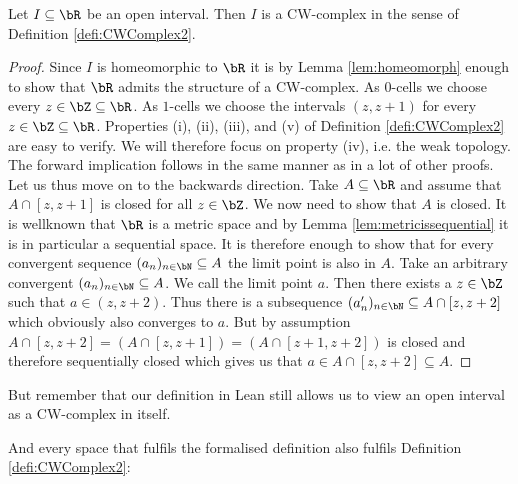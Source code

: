 \begin{example}
  Let $I \subseteq \bR$ be an open interval. 
  Then $I$ is a CW-complex in the sense of Definition \ref{defi:CWComplex2}.
\end{example}
\begin{proof}
  Since $I$ is homeomorphic to $\bR$ it is by Lemma \ref{lem:homeomorph} enough to show that $\bR$ admits the structure of a CW-complex. 
  As $0$-cells we choose every $z \in \bZ \subseteq \bR$. 
  As $1$-cells we choose the intervals $(z, z + 1)$ for every $z \in \bZ \subseteq \bR$.  
  Properties (i), (ii), (iii), and (v) of Definition \ref{defi:CWComplex2} are easy to verify. 
  We will therefore focus on property (iv), i.e. the weak topology. 
  The forward implication follows in the same manner as in a lot of other proofs. 
  Let us thus move on to the backwards direction. 
  Take $A \subseteq \bR$ and assume that $A \cap [z, z + 1]$ is closed for all $z \in \bZ$. 
  We now need to show that $A$ is closed.
  It is wellknown that $\bR$ is a metric space and by Lemma \ref{lem:metricissequential} it is in particular a sequential space. 
  It is therefore enough to show that for every convergent sequence $(a_n)_{n \in \bN} \subseteq A$ the limit point is also in $A$. 
  Take an arbitrary convergent $(a_n)_{n \in \bN} \subseteq A$. 
  We call the limit point $a$.
  Then there exists a $z \in \bZ$ such that $a \in (z, z + 2)$. 
  Thus there is a subsequence $(a'_n)_{n \in \bN} \subseteq A \cap [z, z + 2]$ which obviously also converges to $a$. 
  But by assumption $A \cap [z, z + 2] = (A \cap [z, z + 1]) = (A \cap [z + 1, z + 2])$ is closed and therefore sequentially closed which gives us that $a \in A \cap [z, z + 2] \subseteq A$.
\end{proof}

But remember that our definition in Lean still allows us to view an open interval as a CW-complex in itself.

And every space that fulfils the formalised definition also fulfils Definition \ref{defi:CWComplex2}: 

